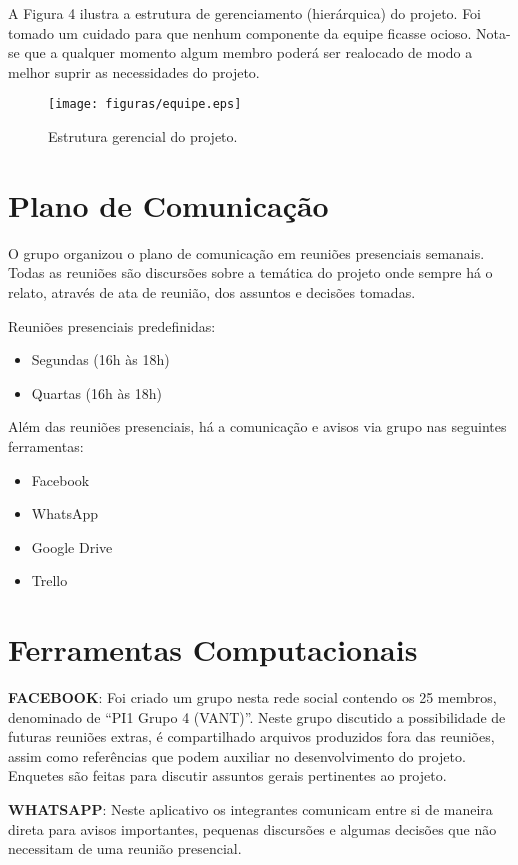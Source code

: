 A Figura 4 ilustra a estrutura de gerenciamento (hierárquica) do projeto. Foi tomado um cuidado para que nenhum componente da equipe ficasse ocioso. Nota-se que a qualquer momento algum membro poderá ser realocado de modo a melhor suprir as necessidades do projeto.

\begin{figure}[ht]
	\centering
		\texttt{[image: figuras/equipe.eps]}
	\caption{Estrutura gerencial do projeto.}
\end{figure}

\section{Plano de Comunicação}
O grupo organizou o plano de comunicação em reuniões presenciais semanais. Todas as reuniões são discursões sobre a temática do projeto onde sempre há o relato, através de ata de reunião, dos assuntos e decisões tomadas. 

Reuniões presenciais predefinidas:
\begin{itemize}
	\item Segundas (16h às 18h)
	\item Quartas (16h às 18h)
\end{itemize}

Além das reuniões presenciais, há a comunicação e avisos via grupo nas seguintes ferramentas:
\begin{itemize}
	\item Facebook
	\item WhatsApp
	\item Google Drive
	\item Trello
\end{itemize}

\section{Ferramentas Computacionais}

\textbf{FACEBOOK}:
Foi criado um grupo nesta rede social contendo os 25 membros, denominado de “PI1 Grupo 4 (VANT)”. Neste grupo discutido a possibilidade de futuras reuniões extras, é compartilhado arquivos produzidos fora das reuniões, assim como referências que podem auxiliar no desenvolvimento do projeto. Enquetes são feitas para discutir assuntos gerais pertinentes ao projeto. 

\textbf{WHATSAPP}: 
Neste aplicativo os integrantes comunicam entre si de maneira direta para avisos importantes, pequenas discursões e algumas decisões que não necessitam de uma reunião presencial.

